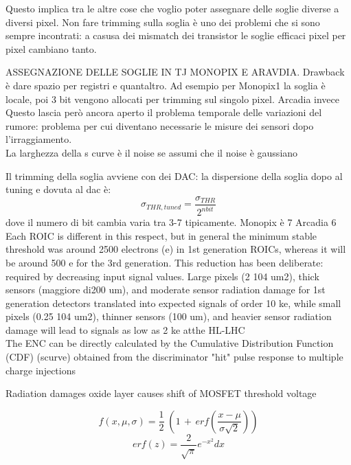         Questo implica tra le altre cose che voglio poter assegnare delle soglie diverse
        a diversi pixel. Non fare trimming sulla soglia è uno dei problemi che si sono sempre incontrati: a casusa dei mismatch dei transistor
        le soglie efficaci pixel per pixel cambiano tanto.


        ASSEGNAZIONE DELLE SOGLIE IN TJ MONOPIX E ARAVDIA.
        Drawback è dare spazio per registri e quantaltro. Ad esempio per Monopix1 la soglia è locale, poi 3 bit vengono allocati per trimming sul singolo pixel.
        Arcadia invece 
        Questo lascia però ancora aperto il problema temporale delle variazioni del rumore:
        problema per cui diventano necessarie le misure dei sensori dopo l'irraggiamento.\\

        La larghezza della s curve è il noise se assumi che il noise è gaussiano


        Il trimming della soglia avviene con dei DAC: la dispersione della soglia dopo al tuning e dovuta al dac è: 
        \begin{equation}
            \sigma_{THR, tuned} = \frac{\sigma_{THR}}{2^{n bit}}
        \end{equation}
        dove il numero di bit cambia varia tra 3-7 tipicamente. Monopix è 7 Arcadia 6\\

        Each ROIC is different in this respect, but in general the minimum stable threshold was around 2500 electrons (e) in 1st generation ROICs, whereas it will be around 500 e for the 3rd generation. This reduction has been deliberate: required by decreasing input signal values. Large pixels (2  104 um2), thick sensors (maggiore di200 um), and moderate sensor radiation damage for 1st generation detectors translated into expected signals of order 10 ke, while small pixels (0.25  104 um2), thinner sensors (100 um), and heavier sensor radiation damage will lead to signals as low as 2 ke atthe HL-LHC\\
        The ENC can be directly calculated by the Cumulative Distribution Function (CDF) (scurve) obtained from the discriminator "hit" pulse response to multiple charge injections

        Radiation damages oxide layer causes shift of MOSFET threshold voltage

        \begin{equation}
            f(x, \mu, \sigma) = \frac{1}{2} \; \left(1\,+\,erf\left(\frac{x-\mu}{\sigma \sqrt{2}}\right)\right)
        \end{equation}
        \begin{equation}
            erf(z) = \frac{2}{\sqrt{\pi}} e^{-x^2} dx 
        \end{equation}   
            
